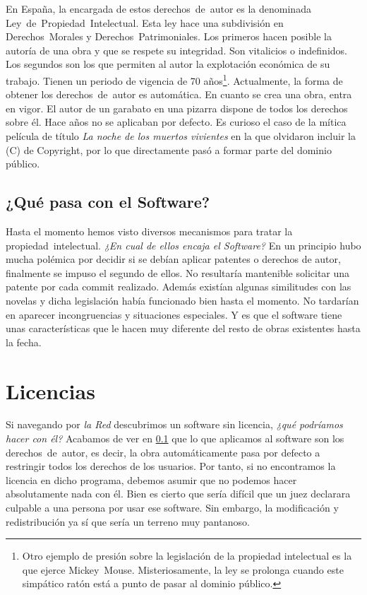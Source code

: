 En España, la encargada de estos derechos~de~autor es la denominada
Ley~de~Propiedad~Intelectual. Esta ley hace una subdivisión en
Derechos~Morales y Derechos~Patrimoniales. Los primeros hacen posible
la autoría de una obra y que se respete su integridad. Son vitalicios
o indefinidos. Los segundos son los que permiten al autor la
explotación económica de su trabajo. Tienen un periodo de vigencia de
70 años\footnote{Otro ejemplo de presión sobre la legislación de la
  propiedad intelectual es la que ejerce
  Mickey~Mouse. Misteriosamente, la ley se prolonga cuando este
  simpático ratón está a punto de pasar al dominio
  público.}. Actualmente, la forma de obtener los derechos~de~autor es
automática. En cuanto se crea una obra, entra en vigor. El autor de un
garabato en una pizarra dispone de todos los derechos sobre él. Hace
años no se aplicaban por defecto. Es curioso el caso de la mítica
película de título \emph{La noche de los muertos vivientes} en la que
olvidaron incluir la (C) de Copyright, por lo que directamente pasó a
formar parte del dominio público.

\subsection{¿Qué pasa con el Software?}
\label{sub:que_pasa}
Hasta el momento hemos visto diversos mecanismos para tratar la
propiedad~intelectual. \emph{¿En cual de ellos encaja el Software?} En
un principio hubo mucha polémica por decidir si se debían aplicar
patentes o derechos de autor, finalmente se impuso el segundo de
ellos. No resultaría mantenible solicitar una patente por cada commit
realizado. Además existían algunas similitudes con las novelas y dicha
legislación había funcionado bien hasta el momento. No tardarían en
aparecer incongruencias y situaciones especiales. Y es que el software
tiene unas características que le hacen muy diferente del resto de
obras existentes hasta la fecha.

\section{Licencias}
Si navegando por \emph{la Red} descubrimos un software sin licencia,
\emph{¿qué podríamos hacer con él?} Acabamos de ver en
\ref{sub:que_pasa} que lo que aplicamos al software son los
derechos~de~autor, es decir, la obra automáticamente pasa por defecto
a restringir todos los derechos de los usuarios. Por tanto, si no
encontramos la licencia en dicho programa, debemos asumir que no
podemos hacer absolutamente nada con él. Bien es cierto que sería
difícil que un juez declarara culpable a una persona por usar ese
software. Sin embargo, la modificación y redistribución ya sí que
sería un terreno muy pantanoso.

